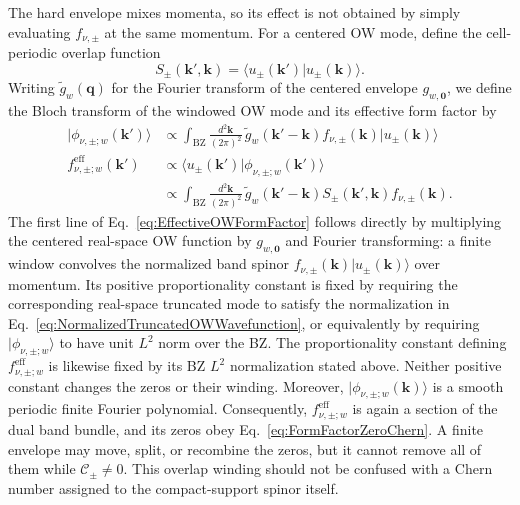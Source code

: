 \documentclass[aps,prb,twocolumn,superscriptaddress,longbibliography,floatfix]{revtex4-2}
\newcommand{\mc}[1]{\mathcal{#1}}
\newcommand{\mr}[1]{\mathrm{#1}}
\theoremstyle{plain}
\theoremstyle{definition}
\theoremstyle{remark}
\begin{document}
The hard envelope mixes momenta, so its effect is not obtained by simply evaluating $f_{\nu,\pm}$ at the same momentum. For a centered OW mode, define the cell-periodic overlap function
\begin{equation}
    S_\pm(\boldsymbol k',\boldsymbol k)
    =
    \langle u_\pm(\boldsymbol k')\vert u_\pm(\boldsymbol k)\rangle.
    \label{eq:BlochOverlapFunction}
\end{equation}
Writing $\widetilde g_w(\boldsymbol q)$ for the Fourier transform of the centered envelope $g_{w,\boldsymbol 0}$, we define the Bloch transform of the windowed OW mode and its effective form factor by
\begin{align}
    \lvert\phi_{\nu,\pm;w}(\boldsymbol k')\rangle
    &\propto
    \int_{\mr{BZ}}\frac{d^2\boldsymbol k}{(2\pi)^2}\,
    \widetilde g_w(\boldsymbol k'-\boldsymbol k)
    f_{\nu,\pm}(\boldsymbol k)
    \lvert u_\pm(\boldsymbol k)\rangle
    \nonumber\\[5pt]
    f^{\mr{eff}}_{\nu,\pm;w}(\boldsymbol k')
    &\propto
    \langle u_\pm(\boldsymbol k')
    \vert\phi_{\nu,\pm;w}(\boldsymbol k')\rangle
    \nonumber\\
    &\propto
    \int_{\mr{BZ}}\frac{d^2\boldsymbol k}{(2\pi)^2}\,
    \widetilde g_w(\boldsymbol k'-\boldsymbol k)
    S_\pm(\boldsymbol k',\boldsymbol k)
    f_{\nu,\pm}(\boldsymbol k).
    \label{eq:EffectiveOWFormFactor}
\end{align}
The first line of Eq.~\eqref{eq:EffectiveOWFormFactor} follows directly by multiplying the centered real-space OW function by $g_{w,\boldsymbol 0}$ and Fourier transforming: a finite window convolves the normalized band spinor $f_{\nu,\pm}(\boldsymbol k)\lvert u_\pm(\boldsymbol k)\rangle$ over momentum. Its positive proportionality constant is fixed by requiring the corresponding real-space truncated mode to satisfy the normalization in Eq.~\eqref{eq:NormalizedTruncatedOWWavefunction}, or equivalently by requiring $\lvert\phi_{\nu,\pm;w}\rangle$ to have unit $L^2$ norm over the BZ. The proportionality constant defining $f^{\mr{eff}}_{\nu,\pm;w}$ is likewise fixed by its BZ $L^2$ normalization stated above. Neither positive constant changes the zeros or their winding. Moreover, $\lvert\phi_{\nu,\pm;w}(\boldsymbol k)\rangle$ is a smooth periodic finite Fourier polynomial. Consequently, $f^{\mr{eff}}_{\nu,\pm;w}$ is again a section of the dual band bundle, and its zeros obey Eq.~\eqref{eq:FormFactorZeroChern}. A finite envelope may move, split, or recombine the zeros, but it cannot remove all of them while $\mc C_\pm\neq0$. This overlap winding should not be confused with a Chern number assigned to the compact-support spinor itself.
\end{document}
